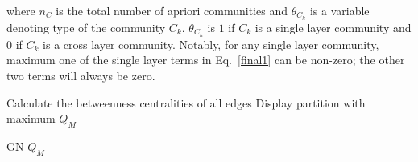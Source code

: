 where $n_C$ is the total number of apriori communities and $\theta_{C_k}$ is a variable denoting type of the community $C_k$. $\theta_{C_k}$
is $1$ if $C_k$ is a single layer community and $0$ if $C_k$ is a cross layer community.
Notably, for any single layer community, maximum one of the single layer terms in Eq.~\ref{final1} can be non-zero; the other
two terms will always be zero.
\vspace{-0.1in}
\begin{algorithm} \small

    \DontPrintSemicolon

     Calculate the betweenness centralities of all edges\;
     Display partition with maximum $Q_M$\;
     \KwRet\;

\caption{GN-$Q_M$} %
\label{algo3}
\end{algorithm}
\vspace{-0.1in}

